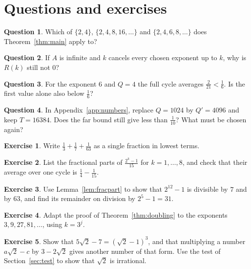 \documentclass[10pt]{article}
\theoremstyle{plain}
\theoremstyle{definition}
\newtheorem{exercise}{Exercise}
\newtheorem{readercheck}{Question}
\theoremstyle{remark}
\begin{document}
\section{Questions and exercises}\label{sec:exercises}

\begin{readercheck}\label{chk:hypotheses}
Which of $\{2,4\}$, $\{2,4,8,16,\dots\}$ and $\{2,4,6,8,\dots\}$ does
Theorem~\ref{thm:main} apply to?
\end{readercheck}

\begin{readercheck}\label{chk:positive}
If $A$ is infinite and $k$ cancels every chosen exponent up to $k$, why is
$R(k)$ still not $0$?
\end{readercheck}

\begin{readercheck}\label{chk:partial}
For the exponent $6$ and $Q=4$ the full cycle averages $\tfrac2{21}<\tfrac16$. Is
the first value alone also below $\tfrac16$?
\end{readercheck}

\begin{readercheck}\label{chk:order}
In Appendix~\ref{app:numbers}, replace $Q=1024$ by $Q'=4096$ and keep
$T=16384$. Does the far bound still give less than $\tfrac1{10}$? What must
be chosen again?
\end{readercheck}

\begin{exercise}\label{ex:1}
Write $\tfrac13+\tfrac17+\tfrac1{63}$ as a single fraction in lowest terms.
\end{exercise}

\begin{exercise}\label{ex:2}
List the fractional parts of $\tfrac{2^k-1}{15}$ for $k=1,\dots,8$, and check that
their average over one cycle is $\tfrac14-\tfrac1{15}$.
\end{exercise}

\begin{exercise}\label{ex:3}
Use Lemma~\ref{lem:fracpart} to show that $2^{12}-1$ is divisible by $7$ and
by $63$, and find its remainder on division by $2^5-1=31$.
\end{exercise}

\begin{exercise}\label{ex:4}
Adapt the proof of Theorem~\ref{thm:doubling} to the exponents
$3,9,27,81,\dots$, using $k=3^j$.
\end{exercise}

\begin{exercise}\label{ex:5}
Show that $5\sqrt2-7=(\sqrt2-1)^3$, and that multiplying a number
$a\sqrt2-c$ by $3-2\sqrt2$ gives another number of that form. Use the test of
Section~\ref{sec:test} to show that $\sqrt2$ is irrational.
\end{exercise}
\end{document}
